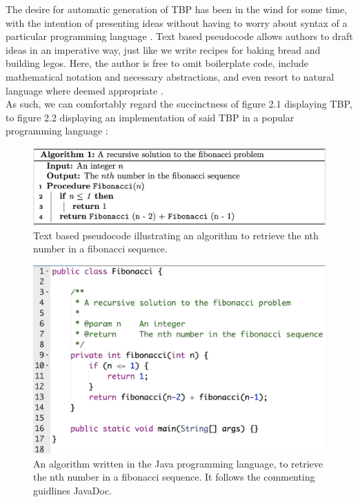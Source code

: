 The desire for automatic generation of TBP has been in the wind for some time, with the intention of presenting ideas without having to worry about syntax of a particular programming language \cite{desireToGetPseudocodeGeneration}. Text based pseudocode allows authors to draft ideas in an imperative way, just like we write recipes for baking bread and building legos. Here, the author is free to omit boilerplate code, include mathematical notation and necessary abstractions, and even resort to natural language where deemed appropriate \cite{BOOK:intro/Cormen/Leiserson}\cite{DBLP:conf/els/Nuallain15}. \hfill \\

As such, we can comfortably regard the succinctness of figure 2.1 displaying TBP, to figure 2.2 displaying an implementation of said TBP in a popular programming language \cite{javaIsAPopularProgrammingLanguage}:

\begin{figure}[ht]
    \centering
    \includegraphics[scale=0.46]{assets/fibonacci_pseudo1.png}
    \caption{Text based pseudocode illustrating an algorithm to retrieve the nth number in a fibonacci sequence.}
    \label{fig:fibseq1}
\end{figure}

\begin{figure}[ht]
    \centering
    \includegraphics[scale=0.50]{assets/fibonacci_java.png}
    \caption[An algorithm written in the Java programming language, to retrieve the nth number in a fibonacci sequence.]{An algorithm written in the Java programming language, to retrieve the nth number in a fibonacci sequence. It follows the commenting guidlines JavaDoc\footnotemark.}
    \label{fig:fibjava}
\end{figure}

